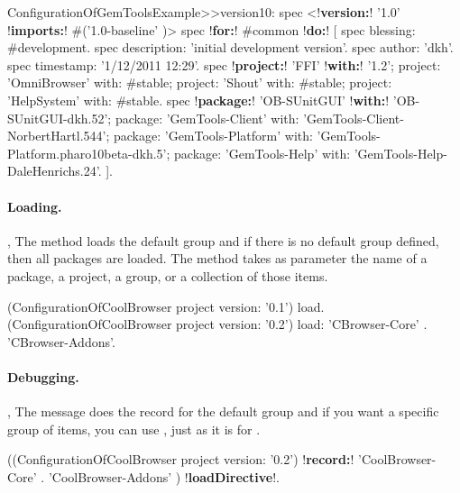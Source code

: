 \documentclass[a4paper,10pt,twoside]{book}
\begin{document}
\begin{footnotesize}
\begin{code}{}
ConfigurationOfGemToolsExample>>version10: spec
     <!\textbf{version:}! '1.0' !\textbf{imports:}! #('1.0-baseline' )>
     spec !\textbf{for:}! #common !\textbf{do:}! [
          spec blessing: #development.
          spec description: 'initial development version'.
          spec author: 'dkh'.
          spec timestamp: '1/12/2011 12:29'.
     spec 
          !\textbf{project:}! 'FFI' !\textbf{with:}! '1.2';
          project: 'OmniBrowser' with: #stable;
          project: 'Shout' with: #stable;
          project: 'HelpSystem' with: #stable.
     spec
          !\textbf{package:}! 'OB-SUnitGUI' !\textbf{with:}! 'OB-SUnitGUI-dkh.52';
          package: 'GemTools-Client' with: 'GemTools-Client-NorbertHartl.544';
          package: 'GemTools-Platform' with: 'GemTools-Platform.pharo10beta-dkh.5';
          package: 'GemTools-Help' with: 'GemTools-Help-DaleHenrichs.24'. ].
\end{code}
\end{footnotesize} 

\paragraph{Loading.} ,  The  method loads the default group and if there is no default group defined, then all packages are loaded. The   method takes as parameter the name of a package, a project, a group, or a collection of those items.

\begin{code}{}
(ConfigurationOfCoolBrowser project version: '0.1') load.
(ConfigurationOfCoolBrowser project version: '0.2') load: {'CBrowser-Core' . 'CBrowser-Addons'}.
\end{code}

\paragraph{Debugging.}
,   The message  does the record for the default group and if you want a specific group of items, you can use , just as it is for .

\begin{code}{}
((ConfigurationOfCoolBrowser project version: '0.2') !\textbf{record:}! 
  		{ 'CoolBrowser-Core' .
		'CoolBrowser-Addons' }) !\textbf{loadDirective}!.
\end{code} 
\end{document}
